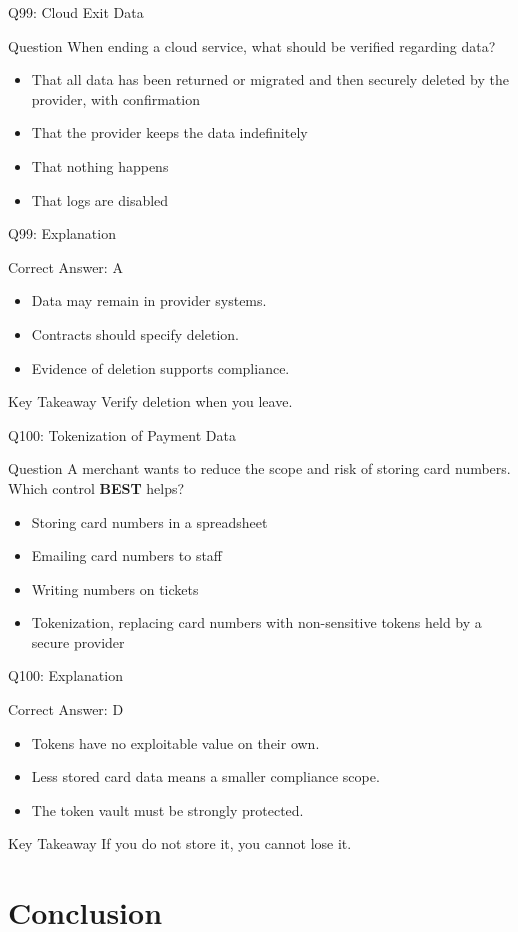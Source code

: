 \documentclass[aspectratio=169]{beamer}
\newcommand{\hq}[7]{%
	\begin{frame}{Q#1: #2}
		\begin{block}{Question}
			#3
		\end{block}
		\begin{itemize}
			#4
		\end{itemize}
	\end{frame}
	\begin{frame}{Q#1: Explanation}
		\begin{block}{Correct Answer: #5}
			\begin{itemize}
				#6
			\end{itemize}
		\end{block}
		\begin{alertblock}{Key Takeaway}
			#7
		\end{alertblock}
	\end{frame}
}
\begin{document}
	\hq{99}{Cloud Exit Data}
	{When ending a cloud service, what should be verified regarding data?}
	{\item[\textbf{(A)}] That all data has been returned or migrated and then securely deleted by the provider, with confirmation
		\item[\textbf{(B)}] That the provider keeps the data indefinitely
		\item[\textbf{(C)}] That nothing happens
		\item[\textbf{(D)}] That logs are disabled}
	{A}
	{\item Data may remain in provider systems.
		\item Contracts should specify deletion.
		\item Evidence of deletion supports compliance.}
	{Verify deletion when you leave.}

	\hq{100}{Tokenization of Payment Data}
	{A merchant wants to reduce the scope and risk of storing card numbers. Which control \textbf{BEST} helps?}
	{\item[\textbf{(A)}] Storing card numbers in a spreadsheet
		\item[\textbf{(B)}] Emailing card numbers to staff
		\item[\textbf{(C)}] Writing numbers on tickets
		\item[\textbf{(D)}] Tokenization, replacing card numbers with non-sensitive tokens held by a secure provider}
	{D}
	{\item Tokens have no exploitable value on their own.
		\item Less stored card data means a smaller compliance scope.
		\item The token vault must be strongly protected.}
	{If you do not store it, you cannot lose it.}

	\section{Conclusion}
\end{document}
